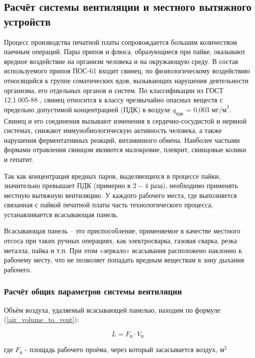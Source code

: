 \newpage

\subsection{Расчёт системы вентиляции и местного вытяжного устройств}

Процесс производства печатной платы сопровождается большим количеством паечным
операций.
Пары припоя и флюса, образующиеся при пайке, оказывают вредное воздействие на
организм человека и на окружающую среду. В состав используемого припоя ПОС-61
входит свинец, по физиологическому воздействию относящийся к группе соматических
ядов, вызывающих нарушения деятельности организма, его отдельных органов и систем.
По классификации из ГОСТ 12.1.005-88 \cite{ecology_gost_005_88}, свинец относится
к классу чрезвычайно опасных веществ с предельно допустимой концентрацией (ПДК)
в воздухе $q_\text{пдк}$ = 0,003 $\text{мг/м}^3$.
Свинец и его соединения вызывают изменения в сердечно-сосудистой и нервной системах,
снижают иммунобиологическую активность человека, а также нарушения ферментативных
реакций, витаминного обмена. Наиболее частыми формами отравления свинцом являются
малокровие, плеврит, свинцовые колики и гепатит.

Так как концентрация вредных паров, выделяющихся в процессе пайки, значительно
превышает ПДК (примерно в $2 - 4$ раза), необходимо применять местную вытяжную вентиляцию.
У каждого рабочего места, где выполняется связанная с пайкой печатной платы часть
технологического процесса, устанавливается всасывающая панель.

Всасывающая панель – это приспособление, применяемое в качестве местного отсоса
при таких ручных операциях, как электросварка, газовая сварка, резка металла,
пайка и т.п. При этом «зеркало» всасывания расположено наклонно к рабочему месту,
что не позволяет попадать вредным веществам в зону дыхания рабочего.

\subsubsection{Расчёт общих параметров системы вентиляции}

Объём воздуха, удаляемый всасывающей панелью, находим по формуле
(\ref{air_volume_to_vent}):

\begin{equation}
\label{air_volume_to_vent}
    L = F_\text{п} \cdot V_\text{п}
\end{equation}

где $F_\text{п}$ - площадь рабочего проёма, через который засасывается воздух, $\text{м}^2$

